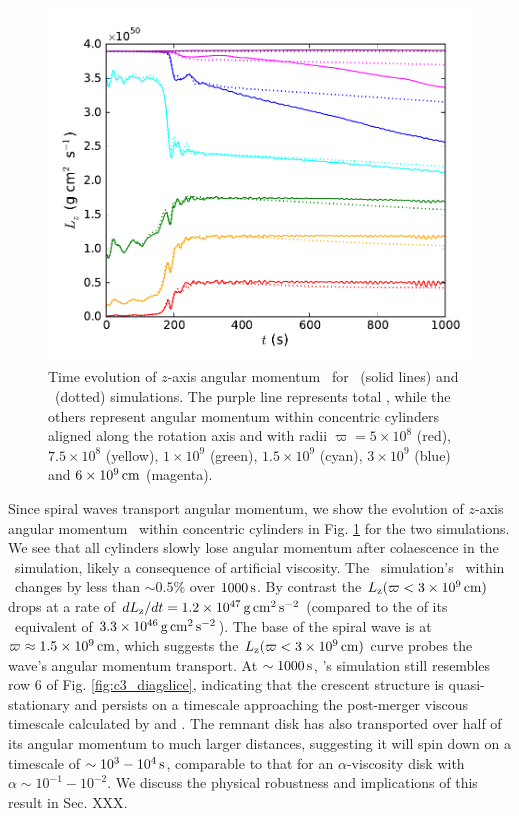 \begin{figure}
\centering
\includegraphics[angle=0,width=0.6\columnwidth]{chapter3_zhu+u/figures/Lz.pdf}
\caption{Time evolution of $z$-axis angular momentum \Lz\ for \arepo\ (solid lines) and \gasoline\ (dotted) simulations.  The purple line represents total \Lz, while the others represent angular momentum within concentric cylinders aligned along the rotation axis and with radii $\varpi = 5\times10^8$ (red), $7.5\times10^8$ (yellow), $1\times10^9$ (green), $1.5\times10^9$ (cyan), $3\times10^9$ (blue) and $6\times10^9\,\mathrm{cm}$ (magenta).}
\label{fig:c3_angmo}
\end{figure}

Since spiral waves transport angular momentum, we show the evolution of $z$-axis angular momentum \Lz\ within concentric cylinders in Fig. \ref{fig:c3_angmo} for the two simulations.  We see that all cylinders slowly lose angular momentum after colaescence in the \gasoline\ simulation, likely a consequence of artificial viscosity.  The \arepo\ simulation's \Lz\ within \innercyl\ changes by less than $\sim0.5$\% over $1000\,\mathrm{s}$.  By contrast the $\Lz(\varpi < 3\times10^9\,\mrm{cm})$ drops at a rate of $d\Lz/dt = 1.2\times10^{47}\,\mrm{g}\,\mrm{cm}^2\,\mrm{s}^{-2}$ (compared to the of its \gasoline\ equivalent of $3.3\times10^{46}\,\mathrm{g}\,\mathrm{cm}^2\,\mathrm{s}^{-2}$).  The base of the spiral wave is at $\varpi \approx 1.5\times10^9\,\mathrm{cm}$, which suggests the $\Lz(\varpi < 3\times10^9\,\mrm{cm})$ curve probes the wave's angular momentum transport.  At $\sim1000\,\mathrm{s}$, \arepo's simulation still resembles row 6 of Fig. \ref{fig:c3_diagslice}, indicating that the crescent structure is quasi-stationary and persists on a timescale approaching the post-merger viscous timescale calculated by \citealt{vkercj10} and \cite{shen+12}.  The remnant disk has also transported over half of its angular momentum to much larger distances, suggesting it will spin down on a timescale of $\sim10^3-10^4\,\mathrm{s}$, comparable to that for an $\alpha$-viscosity disk with $\alpha \sim 10^{-1} - 10^{-2}$.  We discuss the physical robustness and implications of this result in Sec. {\charles XXX}.

